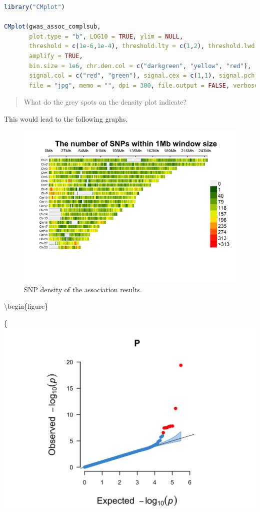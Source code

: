 \documentclass[
]{book}
\begin{document}
\begin{lstlisting}[language=R]
library("CMplot")

CMplot(gwas_assoc_complsub,
       plot.type = "b", LOG10 = TRUE, ylim = NULL,
       threshold = c(1e-6,1e-4), threshold.lty = c(1,2), threshold.lwd = c(1,1), threshold.col = c("black", "grey"),
       amplify = TRUE,
       bin.size = 1e6, chr.den.col = c("darkgreen", "yellow", "red"),
       signal.col = c("red", "green"), signal.cex = c(1,1), signal.pch = c(19,19),
       file = "jpg", memo = "", dpi = 300, file.output = FALSE, verbose = TRUE)
\end{lstlisting}

\begin{quote}
What do the grey spots on the density plot indicate?
\end{quote}

This would lead to the following graphs.

\begin{figure}

{\centering \includegraphics[width=18.67in]{img/_gwas/show-cmplot-all-density} 

}

\caption{SNP density of the association results.}\label{fig:show-cmplot-all-density}
\end{figure}

\textbackslash begin\{figure\}

\{\centering \includegraphics[width=18.67in]{img/_gwas/show-cmplot-all-qq}
\end{document}
